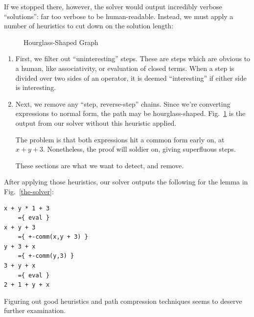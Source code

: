\documentclass[acmsmall,review,anonymous]{acmart}\settopmatter{printfolios=true,printccs=false,printacmref=false}
\begin{document}
If we stopped there, however, the solver would output incredibly verbose
``solutions'': far too verbose to be human-readable. Instead, we must apply a
number of heuristics to cut down on the solution length:
\begin{figure}
  \centering
  \caption{Hourglass-Shaped Graph}
  \label{h-graph}
\end{figure}
\begin{enumerate}
  \item First, we filter out ``uninteresting'' steps. These are steps which are
    obvious to a human, like associativity, or evaluation of closed terms. When
    a step is divided over two sides of an operator, it is deemed
    ``interesting'' if either side is interesting.
  \item Next, we remove any ``step, reverse-step'' chains. Since we're
    converting expressions to normal form, the path may be hourglass-shaped.
    Fig.~\ref{h-graph} is the output from our solver without this heuristic
    applied.

    The problem is that both expressions hit a common form early on, at \(x + y
    + 3\). Nonetheless, the proof will soldier on, giving superfluous steps.

    These sections are what we want to detect, and remove.
\end{enumerate}

After applying those heuristics, our solver outputs the following for the lemma
in Fig.~\ref{the-solver}:
\begin{center}
\begin{BVerbatim}
x + y * 1 + 3
    ={ eval }
x + y + 3
    ={ +-comm(x,y + 3) }
y + 3 + x
    ={ +-comm(y,3) }
3 + y + x
    ={ eval }
2 + 1 + y + x
\end{BVerbatim}
\end{center}
Figuring out good heuristics and path compression techniques seems to deserve
further examination.
\end{document}
